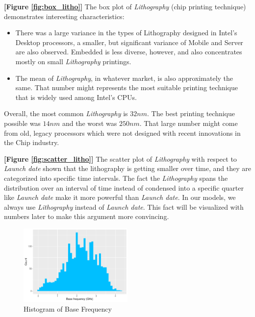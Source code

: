 

\textbf{[Figure \ref{fig:box_litho}]} The box plot of \textit{Lithography} (chip printing technique) demonstrates interesting characteristics:
\begin{itemize}
    \item There was a large variance in the types of Lithography designed in Intel's Desktop processors, a smaller, but significant variance of 
    Mobile and Server are also observed. Embedded is less diverse, however, and also concentrates mostly on small \textit{Lithography} printings.

    \item The mean of \textit{Lithography}, in whatever market, is also approximately the same. That number might represents the most suitable 
    printing technique that is widely used among Intel's CPUs.
\end{itemize}

Overall, the most common \textit{Lithography} is $32 nm$. The best printing technique possible was $14 nm$ and the worst was $250 nm$. That large
number might come from old, legacy processors which were not designed with recent innovations in the Chip industry.

\textbf{[Figure \ref{fig:scatter_litho}]} The scatter plot of \textit{Lithography} with respect to \textit{Launch date} shown that the lithography
is getting smaller over time, and they are categorized into specific time intervals. The fact the \textit{Lithography} spans the distribution over
an interval of time instead of condensed into a specific quarter like \textit{Launch date} make it more powerful than \textit{Launch date}. In our
models, we always use \textit{Lithography} instead of \textit{Launch date}. This fact will be visualized with numbers later to make this argument 
more convincing.







\begin{figure}[H]
    \centering
    \includegraphics[width=0.5\textwidth]{./graphics/hist_bfreq.pdf}
    \caption{Histogram of Base Frequency}
    \label{fig:hist_bfreq}
\end{figure}

